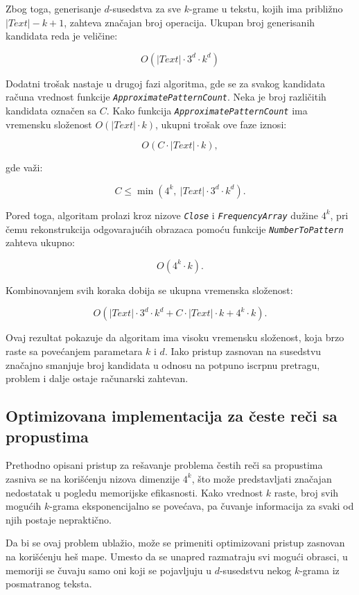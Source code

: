 \documentclass[12pt,oneside]{memoir}
\begin{document}
Zbog toga, generisanje $d$-susedstva za sve $k$-grame u tekstu, kojih ima približno $|Text| - k + 1$, zahteva značajan broj operacija. Ukupan broj generisanih kandidata reda je veličine:

\[
O(|Text| \cdot 3^d \cdot k^d)
\]

Dodatni trošak nastaje u drugoj fazi algoritma, gde se za svakog kandidata računa vrednost funkcije \textit{\texttt{ApproximatePatternCount}}. Neka je broj različitih kandidata označen sa $C$. Kako funkcija \textit{\texttt{ApproximatePatternCount}} ima vremensku složenost $O(|Text| \cdot k)$, ukupni trošak ove faze iznosi:

\[
O(C \cdot |Text| \cdot k),
\]

gde važi:

\[
C \le \min(4^k,\ |Text| \cdot 3^d \cdot k^d).
\]

Pored toga, algoritam prolazi kroz nizove \textit{\texttt{Close}} i \textit{\texttt{FrequencyArray}} dužine $4^k$, pri čemu rekonstrukcija odgovarajućih obrazaca pomoću funkcije \textit{\texttt{NumberToPattern}} zahteva ukupno:

\[
O(4^k \cdot k).
\]

Kombinovanjem svih koraka dobija se ukupna vremenska složenost:

\[
O(|Text| \cdot 3^d \cdot k^d + C \cdot |Text| \cdot k + 4^k \cdot k).
\]

Ovaj rezultat pokazuje da algoritam ima visoku vremensku složenost, koja brzo raste sa povećanjem parametara $k$ i $d$. Iako pristup zasnovan na susedstvu značajno smanjuje broj kandidata u odnosu na potpuno iscrpnu pretragu, problem i dalje ostaje računarski zahtevan.




\subsection{Optimizovana implementacija za česte reči sa propustima}

Prethodno opisani pristup za rešavanje problema čestih reči sa propustima zasniva se na korišćenju nizova dimenzije $4^k$, što može predstavljati značajan nedostatak u pogledu memorijske efikasnosti. Kako vrednost $k$ raste, broj svih mogućih $k$-grama eksponencijalno se povećava, pa čuvanje informacija za svaki od njih postaje nepraktično.

Da bi se ovaj problem ublažio, može se primeniti optimizovani pristup zasnovan na korišćenju heš mape. Umesto da se unapred razmatraju svi mogući obrasci, u memoriji se čuvaju samo oni koji se pojavljuju u $d$-susedstvu nekog $k$-grama iz posmatranog teksta.
\end{document}
